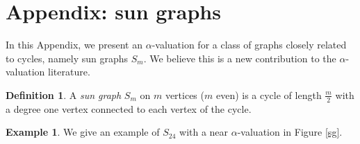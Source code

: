 \documentclass[12pt, a4paper]{article}
\theoremstyle{definition}
\newtheorem{example}[theorem]{Example}
\newtheorem{definition}[theorem]{Definition}
\begin{document}
\section{Appendix: sun graphs}

In this Appendix, we present an $\alpha$-valuation for a class of graphs closely related to cycles, namely sun graphs $S_m$.  We believe this is a new contribution to the $\alpha$-valuation literature. 

\begin{definition}
    A \emph{sun graph} $S_m$ on $m$ vertices ($m$ even) is a cycle of length $\frac{m}{2}$ with a degree one vertex connected to each vertex of the cycle. 
\end{definition}

\begin{example}
    We give an example of $S_{24}$ with a near $\alpha$-valuation in Figure \ref{sg}. 
    

\end{example}
\end{document}
